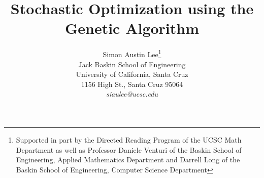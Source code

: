 \title{Stochastic Optimization using the Genetic Algorithm}

\author{ 
Simon Austin Lee\thanks{Supported in part 
by the Directed Reading Program of the UCSC Math Department as well as Professor Daniele Venturi of the Baskin School of Engineering, Applied Mathematics Department and Darrell Long of the Baskin School of Engineering, Computer Science Department}\\
Jack Baskin School of Engineering \\
University of California, Santa Cruz\\
1156 High St., Santa Cruz 95064\\
\emph{siaulee@ucsc.edu}
}\date{}
\maketitle 
